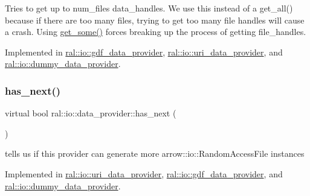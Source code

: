 Tries to get up to num\+\_\+files data\+\_\+handles. We use this instead of a get\+\_\+all() because if there are too many files, trying to get too many file handles will cause a crash. Using \hyperlink{classral_1_1io_1_1data__provider_ae65c935f9812ac3321b0c814fa4a5548}{get\+\_\+some()} forces breaking up the process of getting file\+\_\+handles. 

Implemented in \hyperlink{classral_1_1io_1_1gdf__data__provider_a26fdba323411bb0b8270f735e6e5ee77}{ral\+::io\+::gdf\+\_\+data\+\_\+provider}, \hyperlink{classral_1_1io_1_1uri__data__provider_a53be24f2a445940e82c15b324c7b7c5f}{ral\+::io\+::uri\+\_\+data\+\_\+provider}, and \hyperlink{classral_1_1io_1_1dummy__data__provider_a5ceffe12bf6a535db61b30575f634c8f}{ral\+::io\+::dummy\+\_\+data\+\_\+provider}.

\mbox{\label{classral_1_1io_1_1data__provider_a92176228bbef65093853e2e2165a6d71}} 
\subsubsection{\texorpdfstring{has\+\_\+next()}{has\_next()}}
{\footnotesize\ttfamily virtual bool ral\+::io\+::data\+\_\+provider\+::has\+\_\+next (\begin{DoxyParamCaption}{ }\end{DoxyParamCaption})\hspace{0.3cm}{\ttfamily [pure virtual]}}

tells us if this provider can generate more arrow\+::io\+::\+Random\+Access\+File instances 

Implemented in \hyperlink{classral_1_1io_1_1uri__data__provider_a1815b5e9fa0b323b0cf9c0ff932a1c4b}{ral\+::io\+::uri\+\_\+data\+\_\+provider}, \hyperlink{classral_1_1io_1_1gdf__data__provider_af7ad84e9da11d439efe9328db3531855}{ral\+::io\+::gdf\+\_\+data\+\_\+provider}, and \hyperlink{classral_1_1io_1_1dummy__data__provider_a18a1c55f0a6042dfa5edc6bc0235b518}{ral\+::io\+::dummy\+\_\+data\+\_\+provider}.

\mbox{\label{classral_1_1io_1_1data__provider_ab762cbdb9fd702a61b48785c84e91536}} 
